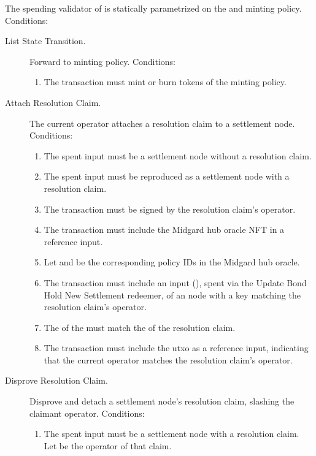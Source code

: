 \documentclass[../midgard.tex]{subfiles}
\begin{document}
The spending validator of  is statically parametrized on the  and  minting policy.
Conditions:
\begin{description}
  \item[List State Transition.] Forward to minting policy.
    Conditions:
      \begin{enumerate}
          \item The transaction must mint or burn tokens of the  minting policy.
      \end{enumerate}
  \item[Attach Resolution Claim.] The current operator attaches a resolution claim to a settlement node.
    Conditions:
      \begin{enumerate}
        \item The spent input must be a settlement node without a resolution claim.
        \item The spent input must be reproduced as a settlement node with a resolution claim.
        \item The transaction must be signed by the resolution claim's operator.
        \item The transaction must include the Midgard hub oracle NFT in a reference input.
        \item Let  and  be the corresponding policy IDs in the Midgard hub oracle.
        \item The transaction must include an input (), spent via the Update Bond Hold New Settlement redeemer, of an  node with a key matching the resolution claim's operator.
        \item The  of the  must match the  of the resolution claim.
        \item The transaction must include the  utxo as a reference input, indicating that the current operator matches the resolution claim's operator.
      \end{enumerate}
  \item[Disprove Resolution Claim.] Disprove and detach a settlement node's resolution claim, slashing the claimant operator.
    Conditions:
      \begin{enumerate}
        \item The spent input must be a settlement node with a resolution claim.
          Let  be the operator of that claim.

\end{enumerate}
\end{description}
\end{document}
